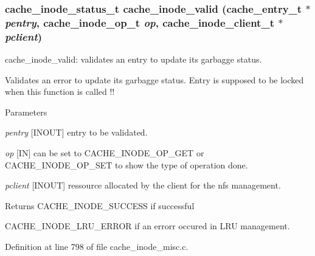 \subsubsection[{cache\_\-inode\_\-valid}]{\setlength{\rightskip}{0pt plus 5cm}cache\_\-inode\_\-status\_\-t cache\_\-inode\_\-valid (cache\_\-entry\_\-t $\ast$ {\em pentry}, \/  cache\_\-inode\_\-op\_\-t {\em op}, \/  cache\_\-inode\_\-client\_\-t $\ast$ {\em pclient})}\label{cache__inode__misc_8c_aa34ae3526aa5eb8bc0f96e54a3fe8861}
cache\_\-inode\_\-valid: validates an entry to update its garbagge status.

Validates an error to update its garbagge status. Entry is supposed to be locked when this function is called !!


\begin{DoxyParams}{Parameters}
\item[{\em pentry}][INOUT] entry to be validated. \item[{\em op}][IN] can be set to CACHE\_\-INODE\_\-OP\_\-GET or CACHE\_\-INODE\_\-OP\_\-SET to show the type of operation done. \item[{\em pclient}][INOUT] ressource allocated by the client for the nfs management.\end{DoxyParams}
\begin{DoxyReturn}{Returns}
CACHE\_\-INODE\_\-SUCCESS if successful \par
 

CACHE\_\-INODE\_\-LRU\_\-ERROR if an errorr occured in LRU management. 
\end{DoxyReturn}


Definition at line 798 of file cache\_\-inode\_\-misc.c.